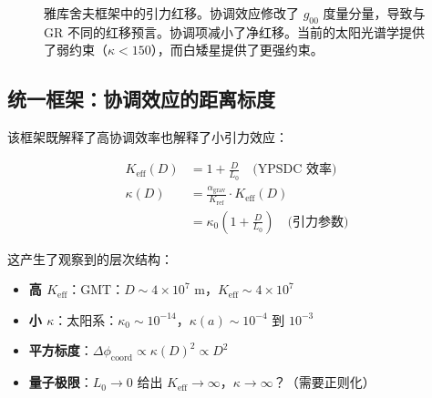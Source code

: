 \documentclass[11pt,a4paper]{article}
\begin{document}
\begin{figure}[htbp]
{
		}
		\caption{雅库舍夫框架中的引力红移。协调效应修改了 $g_{00}$ 度量分量，导致与 GR 不同的红移预言。协调项减小了净红移。当前的太阳光谱学提供了弱约束（$\kappa < 150$），而白矮星提供了更强约束。}
		\label{fig:redshift-detailed}
	\end{figure}
	
	\subsection{统一框架：协调效应的距离标度}
	
	该框架既解释了高协调效率也解释了小引力效应：
	
	\begin{align}
		K_{\mathrm{eff}}(D) &= 1 + \frac{D}{L_0} \quad \text{(YPSDC 效率)} \\
		\kappa(D) &= \frac{\alpha_{\text{grav}}}{K_{\text{ref}}} \cdot K_{\mathrm{eff}}(D) \\
		&= \kappa_0 \left(1 + \frac{D}{L_0}\right) \quad \text{(引力参数)}
	\end{align}
	
	这产生了观察到的层次结构：
	\begin{itemize}
		\item \textbf{高 $K_{\mathrm{eff}}$}：GMT：$D \sim 4\times10^7$ m，$K_{\mathrm{eff}} \sim 4\times10^7$
		\item \textbf{小 $\kappa$}：太阳系：$\kappa_0 \sim 10^{-14}$，$\kappa(a) \sim 10^{-4}$ 到 $10^{-3}$
		\item \textbf{平方标度}：$\Delta\phi_{\text{coord}} \propto \kappa(D)^2 \propto D^2$
		\item \textbf{量子极限}：$L_0 \to 0$ 给出 $K_{\mathrm{eff}} \to \infty$，$\kappa \to \infty$？（需要正则化）
	\end{itemize}
	
\end{document}
